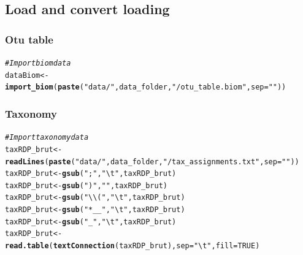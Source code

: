 \documentclass[12pt]{article}\usepackage[]{graphicx}\usepackage[]{color}
\makeatletter
\newcommand{\hlnum}[1]{\textcolor[rgb]{0.686,0.059,0.569}{#1}}%
\newcommand{\hlstr}[1]{\textcolor[rgb]{0.192,0.494,0.8}{#1}}%
\newcommand{\hlcom}[1]{\textcolor[rgb]{0.678,0.584,0.686}{\textit{#1}}}%
\newcommand{\hlstd}[1]{\textcolor[rgb]{0.345,0.345,0.345}{#1}}%
\newcommand{\hlkwb}[1]{\textcolor[rgb]{0.69,0.353,0.396}{#1}}%
\newcommand{\hlkwc}[1]{\textcolor[rgb]{0.333,0.667,0.333}{#1}}%
\newcommand{\hlkwd}[1]{\textcolor[rgb]{0.737,0.353,0.396}{\textbf{#1}}}%
\newenvironment{kframe}{%
 \def\at@end@of@kframe{}%
 \ifinner\ifhmode%
  \def\at@end@of@kframe{\end{minipage}}%
  \begin{minipage}{\columnwidth}%
 \fi\fi%
 \def\FrameCommand##1{\hskip\@totalleftmargin \hskip-\fboxsep
 \colorbox{shadecolor}{##1}\hskip-\fboxsep
     \hskip-\linewidth \hskip-\@totalleftmargin \hskip\columnwidth}%
 \MakeFramed {\advance\hsize-\width
   \@totalleftmargin\z@ \linewidth\hsize
   \@setminipage}}%
 {\par\unskip\endMakeFramed%
 \at@end@of@kframe}
\newenvironment{knitrout}{}{} %
\numberwithin{figure}{section}
\makeatother
\begin{document}
  \subsection{Load and convert loading}
  \subsubsection{Otu table}
\begin{knitrout}\small
{}\color{fgcolor}\begin{kframe}
\begin{alltt}
\hlcom{#Import biom data}
\hlstd{dataBiom}   \hlkwb{<-} \hlkwd{import_biom}\hlstd{(}\hlkwd{paste}\hlstd{(}\hlstr{"data/"}\hlstd{, data_folder,} \hlstr{"/otu_table.biom"}\hlstd{,} \hlkwc{sep}\hlstd{=}\hlstr{""}\hlstd{))}
\end{alltt}
\end{kframe}
\end{knitrout}

  \subsubsection{Taxonomy}
\begin{knitrout}\small
{}\color{fgcolor}\begin{kframe}
\begin{alltt}
\hlcom{#Import taxonomy data}
\hlstd{taxRDP_brut} \hlkwb{<-} \hlkwd{readLines}\hlstd{(}\hlkwd{paste}\hlstd{(}\hlstr{"data/"}\hlstd{, data_folder,} \hlstr{"/tax_assignments.txt"}\hlstd{,} \hlkwc{sep}\hlstd{=}\hlstr{""}\hlstd{))}
\hlstd{taxRDP_brut} \hlkwb{<-} \hlkwd{gsub}\hlstd{(}\hlstr{";"}\hlstd{,} \hlstr{"\textbackslash{}t"}\hlstd{, taxRDP_brut)}
\hlstd{taxRDP_brut} \hlkwb{<-} \hlkwd{gsub}\hlstd{(}\hlstr{")"}\hlstd{,} \hlstr{""}\hlstd{, taxRDP_brut)}
\hlstd{taxRDP_brut} \hlkwb{<-} \hlkwd{gsub}\hlstd{(}\hlstr{"\textbackslash{}\textbackslash{}("}\hlstd{,} \hlstr{"\textbackslash{}t"}\hlstd{, taxRDP_brut)}
\hlstd{taxRDP_brut} \hlkwb{<-} \hlkwd{gsub}\hlstd{(}\hlstr{"*__"}\hlstd{,} \hlstr{"\textbackslash{}t"}\hlstd{, taxRDP_brut)}
\hlstd{taxRDP_brut} \hlkwb{<-} \hlkwd{gsub}\hlstd{(}\hlstr{"_"}\hlstd{,} \hlstr{"\textbackslash{}t"}\hlstd{, taxRDP_brut)}
\hlstd{taxRDP_brut} \hlkwb{<-} \hlkwd{read.table}\hlstd{(}\hlkwd{textConnection}\hlstd{(taxRDP_brut),} \hlkwc{sep} \hlstd{=} \hlstr{"\textbackslash{}t"}\hlstd{,} \hlkwc{fill} \hlstd{=} \hlnum{TRUE}\hlstd{)}
\end{alltt}
\end{kframe}
\end{knitrout}
\end{document}
